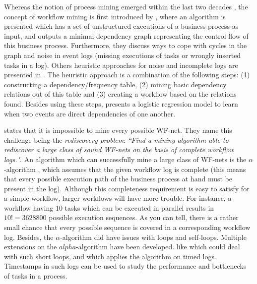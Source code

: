 \documentclass[a4paper,11pt]{article}
\begin{document}
Whereas the notion of process mining emerged within the last two decades \cite{VanderAalst2003}, the concept of workflow mining is first introduced by \cite{Agrawal1998}, where an algorithm is presented which has a set of unstructured executions of a business process as input, and outputs a minimal dependency graph representing the control flow of this business process. Furthermore, they discuss ways to cope with cycles in the graph and noise in event logs (missing executions of tasks or wrongly inserted tasks in a log). Others heuristic approaches for noise and incomplete logs are presented in \cite{Maruster2002,Weijters2001,Weijters}. The heuristic approach \cite{Weijters2001,Weijters} is a combination of the following steps: (1) constructing a dependency/frequency table, (2) mining basic dependency relations out of this table and (3) creating a workflow based on the relations found. Besides using these steps, \cite{Maruster2002} presents a logistic regression model to learn when two events are direct dependencies of one another. 

\cite{VanDerAalst2002} states that it is impossible to mine every possible WF-net. They name this challenge being the \textit{rediscovery problem}: \textit{``Find a mining algorithm able to rediscover a large class of sound WF-nets on the basis of complete workflow logs."}\cite{VanDerAalst2002}. An algorithm which can successfully mine a large class of WF-nets is the $\alpha$-algorithm \cite{VanderAalst2003,VanDerAalst2002,VanderAalst2002TimedLogs}, which assumes that the given workflow log is complete (this means that every possible execution path of the business process at hand must be present in the log). Although this completeness requirement is easy to satisfy for a simple workflow, larger workflows will have more trouble. For instance, a workflow having 10 tasks which can be executed in parallel results in $10!=3628800$ possible execution sequences. As you can tell, there is a rather small chance that every possible sequence is covered in a corresponding workflow log. Besides, the $\alpha$-algorithm did have issues with loops and self-loops. Multiple extensions on the $alpha$-algorithm have been developed. like \cite{A+-algorithm2004} which could deal with such short loops, and \cite{VanderAalst2002TimedLogs} which applies the algorithm on timed logs. Timestamps in such logs can be used to study the performance and bottlenecks of tasks in a process.\\
\\
\end{document}
